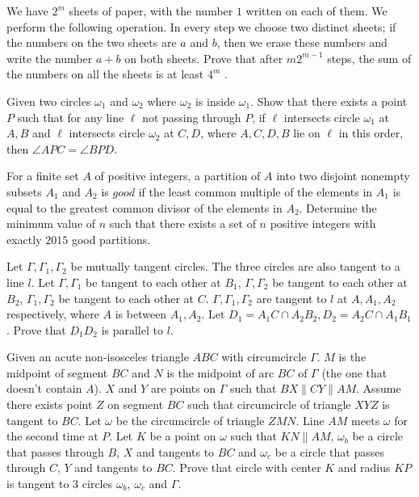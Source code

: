 \documentclass[11pt]{scrartcl}
\begin{document}
\begin{problem}[42799615327279]
We have $2^m$ sheets of paper, with the number $1$ written on each of them. We perform the following operation. In every step we choose two distinct sheets; if the numbers on the two sheets are $a$ and $b$, then we erase these numbers and write the number $a + b$ on both sheets. Prove that after $m2^{m -1}$ steps, the sum of the numbers on all the sheets is at least $4^m$ .
\end{problem}
\begin{problem}[7268978143074030034]
Given two circles $\omega_1$ and $\omega_2$ where $\omega_2$ is inside $\omega_1$. Show that there exists a point $P$ such that for any line $\ell$ not passing through $P$, if $\ell$ intersects circle $\omega_1$ at $A,B$ and $\ell$ intersects circle $\omega_2$ at $C,D$, where $A,C,D,B$ lie on $\ell$ in this order, then $\angle APC=\angle BPD$.
\end{problem}
\begin{problem}[3004928220875310213]
For a finite set $A$ of positive integers, a partition of $A$ into two disjoint nonempty subsets $A_1$ and $A_2$ is $\textit{good}$ if the least common multiple of the elements in $A_1$ is equal to the greatest common divisor of the elements in $A_2$. Determine the minimum value of $n$ such that there exists a set of $n$ positive integers with exactly $2015$ good partitions.
\end{problem}
\begin{problem}[1121095467606378762]
	Let $\Gamma, \Gamma_1, \Gamma_2$ be mutually tangent circles. The three circles are also tangent to a line $l$. Let $\Gamma, \Gamma_1$ be tangent to each other at $B_1$, $\Gamma, \Gamma_2$ be tangent to each other at $B_2$, $\Gamma_1, \Gamma_2$ be tangent to each other at $C$. $\Gamma, \Gamma_1, \Gamma_2$ are tangent to $l$ at $A, A_1, A_2$ respectively, where $A$ is between $A_1,A_2$. Let $D_1 = A_1C \cap A_2B_2, D_2 = A_2C \cap A_1B_1$. Prove that $D_1D_2$ is parallel to $l$.
\end{problem}
\begin{problem}[3486221094563725571]
Given an acute non-isosceles triangle $ABC$ with circumcircle $\Gamma$. $M$ is the midpoint of segment $BC$ and $N$ is the midpoint of arc $BC$ of $\Gamma$ (the one that doesn't contain $A$). $X$ and $Y$ are points on $\Gamma$ such that $BX\parallel CY\parallel AM$. Assume there exists point $Z$ on segment $BC$ such that circumcircle of triangle $XYZ$ is tangent to $BC$. Let $\omega$ be the circumcircle of triangle $ZMN$. Line $AM$ meets $\omega$ for the second time at $P$. Let $K$ be a point on $\omega$ such that $KN\parallel AM$, $\omega_b$ be a circle that passes through $B$, $X$ and tangents to $BC$ and $\omega_c$ be a circle that passes through $C$, $Y$ and tangents to $BC$. Prove that circle with center $K$ and radius $KP$ is tangent to 3 circles $\omega_b$, $\omega_c$ and $\Gamma$.
\end{problem}
\end{document}
